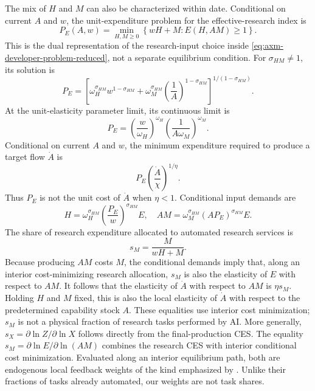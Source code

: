 The mix of \(H\) and \(M\) can also be characterized within date. Conditional
on current \(A\) and \(w\), the unit-expenditure problem for the
effective-research index is
\begin{equation}
 P_E(A,w)=\min_{H,M\geq0}\left\{wH+M:
 E(H,AM)\geq1\right\}.
 \label{eq:axm-research-cost-problem}
\end{equation}
This is the dual representation of the research-input choice inside
\eqref{eq:axm-developer-problem-reduced}, not a separate equilibrium condition.
For \(\sigma_{HM}\neq1\), its solution is
\begin{equation}
 P_E=\left[\omega_H^{\sigma_{HM}}w^{1-\sigma_{HM}}
 +\omega_M^{\sigma_{HM}}\left(\frac{1}{A}\right)^{1-\sigma_{HM}}
 \right]^{1/(1-\sigma_{HM})}.
 \label{eq:axm-research-price}
\end{equation}
At the unit-elasticity parameter limit, its continuous limit is
\begin{equation}
 P_E=\left(\frac{w}{\omega_H}\right)^{\omega_H}
 \left(\frac{1}{A\omega_M}\right)^{\omega_M}.
 \label{eq:axm-research-price-cd}
\end{equation}
Conditional on current \(A\) and \(w\), the minimum expenditure required to
produce a target flow \(\dot A\) is
\begin{equation}
 P_E\left(\frac{\dot A}{\chi}\right)^{1/\eta}.
 \label{eq:axm-research-expenditure-function}
\end{equation}
Thus \(P_E\) is not the unit cost of \(\dot A\) when \(\eta<1\).
Conditional input demands are
\begin{equation}
 H=\omega_H^{\sigma_{HM}}\left(\frac{P_E}{w}\right)^{\sigma_{HM}}E,
 \quad
 AM=\omega_M^{\sigma_{HM}}(AP_E)^{\sigma_{HM}}E.
 \label{eq:axm-research-demands}
\end{equation}
The share of research expenditure allocated to automated research services is
\begin{equation}
 s_M=\frac{M}{wH+M}.
 \label{eq:axm-sm}
\end{equation}
Because producing \(AM\) costs \(M\), the conditional demands imply that, along
an interior cost-minimizing research allocation, \(s_M\) is also the elasticity
of \(E\) with respect to \(AM\). It follows that the elasticity of \(\dot A\)
with respect to \(AM\) is \(\eta s_M\). Holding \(H\) and \(M\) fixed, this is
also the local elasticity of \(\dot A\) with respect to the predetermined
capability stock \(A\). These equalities use interior cost minimization; \(s_M\)
is not a physical fraction of research tasks performed by AI. More generally,
\(s_X=\partial\ln Z/\partial\ln X\) follows directly from the
final-production CES. The equality
\(s_M=\partial\ln E/\partial\ln(AM)\) combines the research CES with interior
conditional cost minimization. Evaluated along an interior equilibrium path,
both are endogenous local feedback weights of the kind emphasized by
\citet{davidsonetal2026}. Unlike their fractions of tasks already automated, our
weights are not task shares.

